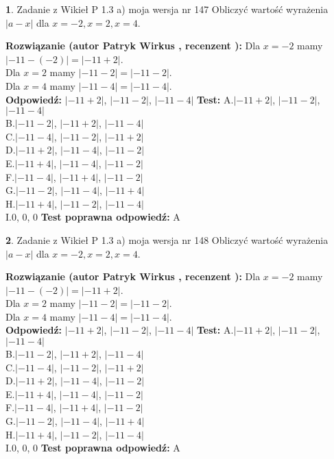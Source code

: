 \documentclass[12pt, a4paper]{article}
\theoremstyle{definition} %
\newtheorem{zad}{}
\newcommand{\zadStart}[1]{\begin{zad}#1\newline}
\newcommand{\zadStop}{\end{zad}}
\newcommand{\rozwStart}[2]{\noindent \textbf{Rozwiązanie (autor #1 , recenzent #2): }\newline}
\newcommand{\rozwStop}{\newline}
\newcommand{\odpStart}{\noindent \textbf{Odpowiedź:}\newline}
\newcommand{\odpStop}{\newline}
\newcommand{\testStart}{\noindent \textbf{Test:}\newline}
\newcommand{\testStop}{\newline}
\newcommand{\kluczStart}{\noindent \textbf{Test poprawna odpowiedź:}\newline}
\newcommand{\kluczStop}{\newline}
\begin{document}
\zadStart{Zadanie z Wikieł P 1.3 a) moja wersja nr 147}
Obliczyć wartość wyrażenia $|a - x|$ dla $x=-2,x=2,x=4$.
\zadStop
\rozwStart{Patryk Wirkus}{}
Dla $x = -2$ mamy $|-11 - (-2)| = |-11 + 2|$.\\
Dla $x = 2$ mamy $|-11 - 2| = |-11 - 2|$.\\
Dla $x = 4$ mamy $|-11 - 4| = |-11 - 4|$.\\
\rozwStop
\odpStart
$|-11 + 2|$, $|-11 - 2|$, $|-11 - 4|$
\odpStop
\testStart
A.$|-11 + 2|$, $|-11 - 2|$, $|-11 - 4|$\\
B.$|-11 - 2|$, $|-11 + 2|$, $|-11 - 4|$\\
C.$|-11 - 4|$, $|-11 - 2|$, $|-11 + 2|$\\
D.$|-11 + 2|$, $|-11 - 4|$, $|-11 - 2|$\\
E.$|-11 + 4|$, $|-11 - 4|$, $|-11 - 2|$\\
F.$|-11 - 4|$, $|-11 + 4|$, $|-11 - 2|$\\
G.$|-11 - 2|$, $|-11 - 4|$, $|-11 + 4|$\\
H.$|-11 + 4|$, $|-11 - 2|$, $|-11 - 4|$\\
I.$0$, $0$, $0$
\testStop
\kluczStart
A
\kluczStop



\zadStart{Zadanie z Wikieł P 1.3 a) moja wersja nr 148}
Obliczyć wartość wyrażenia $|a - x|$ dla $x=-2,x=2,x=4$.
\zadStop
\rozwStart{Patryk Wirkus}{}
Dla $x = -2$ mamy $|-11 - (-2)| = |-11 + 2|$.\\
Dla $x = 2$ mamy $|-11 - 2| = |-11 - 2|$.\\
Dla $x = 4$ mamy $|-11 - 4| = |-11 - 4|$.\\
\rozwStop
\odpStart
$|-11 + 2|$, $|-11 - 2|$, $|-11 - 4|$
\odpStop
\testStart
A.$|-11 + 2|$, $|-11 - 2|$, $|-11 - 4|$\\
B.$|-11 - 2|$, $|-11 + 2|$, $|-11 - 4|$\\
C.$|-11 - 4|$, $|-11 - 2|$, $|-11 + 2|$\\
D.$|-11 + 2|$, $|-11 - 4|$, $|-11 - 2|$\\
E.$|-11 + 4|$, $|-11 - 4|$, $|-11 - 2|$\\
F.$|-11 - 4|$, $|-11 + 4|$, $|-11 - 2|$\\
G.$|-11 - 2|$, $|-11 - 4|$, $|-11 + 4|$\\
H.$|-11 + 4|$, $|-11 - 2|$, $|-11 - 4|$\\
I.$0$, $0$, $0$
\testStop
\kluczStart
A
\kluczStop
\end{document}
